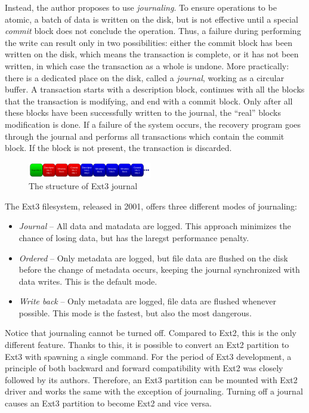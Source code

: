 \documentclass{acm_proc_article-sp}
\begin{document}
Instead, the author proposes to use {\it journaling}. To ensure operations to be atomic, a batch of data is written on the disk, but is not effective until a special {\it commit} block does not conclude the operation. Thus, a failure during performing the write can result only in two possibilities: either the commit block has been written on the disk, which means the transaction is complete, or it has not been written, in which case the transaction as a whole is undone. More practically: there is a dedicated place on the disk, called a {\it journal}, working as a circular buffer. A transaction starts with a description block, continues with all the blocks that the transaction is modifying, and end with a commit block. Only after all these blocks have been successfully written to the journal, the ``real'' blocks modification is done. If a failure of the system occurs, the recovery program goes through the journal and performs all transactions which contain the commit block. If the block is not present, the transaction is discarded.

\begin{figure}
\centering
\includegraphics[width=0.48\textwidth]{images/journal.pdf}
	\caption{The structure of Ext3 journal \cite{takingadvantage}}
\end{figure}

The Ext3 filesystem, released in 2001, offers three different modes of journaling: \cite{takingadvantage}

\begin{itemize}
	\item {\it Journal} -- All data and matadata are logged. This approach minimizes the chance of losing data, but has the laregst performance penalty.
	\item {\it Ordered} -- Only metadata are logged, but file data are flushed on the disk before the change of metadata occurs, keeping the journal synchronized with data writes. This is the default mode.
	\item {\it Write back} -- Only metadata are logged, file data are flushed whenever possible. This mode is the fastest, but also the most dangerous.
\end{itemize}

Notice that journaling cannot be turned off. Compared to Ext2, this is the only different feature. Thanks to this, it is possible to convert an Ext2 partition to Ext3 with spawning a single command.
For the period of Ext3 development, a principle of both backward and forward compatibility with Ext2 was closely followed by its authors. Therefore, an Ext3 partition can be mounted with Ext2 driver and works the same with the exception of journaling. Turning off a journal causes an Ext3 partition to become Ext2 and vice versa.
\end{document}
